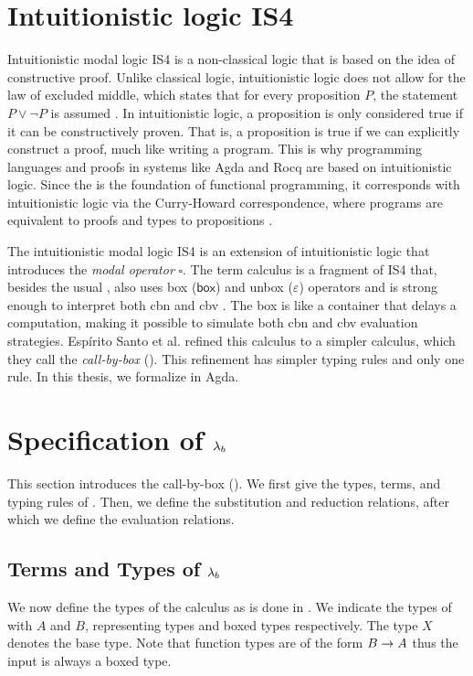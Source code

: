 
\section{Intuitionistic logic \textsf{IS4}}
Intuitionistic modal logic \textsf{IS4} is a non-classical logic that is based on the idea of constructive proof.
Unlike classical logic, intuitionistic logic does not allow for the law of excluded middle, which states that for every proposition $P$,
the statement $P \lor \neg P$ is assumed \cite{Heyting1930, sep-intuitionistic-logic-development}.
In intuitionistic logic, a proposition is only considered true if it can be constructively proven.
That is, a proposition is true if we can explicitly construct a proof, much like writing a program.
This is why programming languages and proofs in systems like Agda and Rocq are based on intuitionistic logic.
Since the \lc is the foundation of functional programming, it corresponds with intuitionistic logic via the Curry-Howard correspondence,
where programs are equivalent to proofs and types to propositions \cite{Howard1980}.

The intuitionistic modal logic \textsf{IS4} is an extension of intuitionistic logic that introduces the \emph{modal operator} $\square$.
The term calculus \labox is a fragment of \textsf{IS4} that, besides the usual \lterms, also uses box ($\mathsf{box}$) and unbox ($\varepsilon$) operators 
and is strong enough to interpret both \textsf{cbn} and \textsf{cbv} \cite{espritosanto_et_al:LIPIcs:2019:10525}.
The box is like a container that delays a computation, making it possible to simulate both \textsf{cbn} and \textsf{cbv} evaluation strategies.
Espírito Santo et al. refined this calculus to a simpler calculus, which they call the \emph{call-by-box} \lc (\lab). 
This refinement has simpler typing rules and only one \br rule.
In this thesis, we formalize \lab in Agda.

\section{\texorpdfstring{Specification of \boldmath${\lambda_b}$}{ Specification of the call-by-box lambda calculus}}
This section introduces the call-by-box \lc (\lab). 
We first give the types, terms, and typing rules of \lab.
Then, we define the substitution and reduction relations, after which we define the evaluation relations.

\subsection{\texorpdfstring{Terms and Types of \boldmath${\lambda_b}$}{ Terms and Types of the boxed lambda calculus}}
We now define the types of the \lab calculus as is done in \cite{espritosanto_et_al:LIPIcs:2019:10525}. We indicate the types of \lab with $A$ and $B$, representing types and boxed types respectively.
The type $X$ denotes the base type. Note that function types are of the form $B \to A$ thus the input is always a boxed type.

